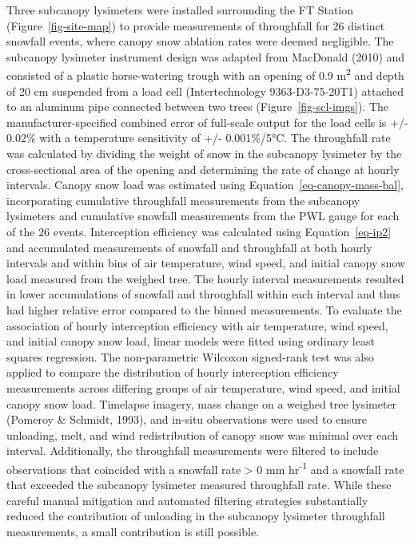 \documentclass[
  letterpaper,
  DIV=11,
  numbers=noendperiod]{scrartcl}
\begin{document}
Three subcanopy lysimeters were installed surrounding the FT Station
(Figure~\ref{fig-site-map}) to provide measurements of throughfall for
26 distinct snowfall events, where canopy snow ablation rates were
deemed negligible. The subcanopy lysimeter instrument design was adapted
from MacDonald (2010) and consisted of a plastic horse-watering trough
with an opening of 0.9 m\textsuperscript{2} and depth of 20 cm suspended
from a load cell (Intertechnology 9363-D3-75-20T1) attached to an
aluminum pipe connected between two trees (Figure~\ref{fig-scl-imgs}).
The manufacturer-specified combined error of full-scale output for the
load cells is +/- 0.02\% with a temperature sensitivity of +/-
0.001\%/5°C. The throughfall rate was calculated by dividing the weight
of snow in the subcanopy lysimeter by the cross-sectional area of the
opening and determining the rate of change at hourly intervals. Canopy
snow load was estimated using Equation~\ref{eq-canopy-mass-bal},
incorporating cumulative throughfall measurements from the subcanopy
lysimeters and cumulative snowfall measurements from the PWL gauge for
each of the 26 events. Interception efficiency was calculated using
Equation~\ref{eq-ip2} and accumulated measurements of snowfall and
throughfall at both hourly intervals and within bins of air temperature,
wind speed, and initial canopy snow load measured from the weighed tree.
The hourly interval measurements resulted in lower accumulations of
snowfall and throughfall within each interval and thus had higher
relative error compared to the binned measurements. To evaluate the
association of hourly interception efficiency with air temperature, wind
speed, and initial canopy snow load, linear models were fitted using
ordinary least squares regression. The non-parametric Wilcoxon
signed-rank test was also applied to compare the distribution of hourly
interception efficiency measurements across differing groups of air
temperature, wind speed, and initial canopy snow load. Timelapse
imagery, mass change on a weighed tree lysimeter (Pomeroy \& Schmidt,
1993), and in-situ observations were used to ensure unloading, melt, and
wind redistribution of canopy snow was minimal over each interval.
Additionally, the throughfall measurements were filtered to include
observations that coincided with a snowfall rate \textgreater{} 0 mm
hr\textsuperscript{-1} and a snowfall rate that exceeded the subcanopy
lysimeter measured throughfall rate. While these careful manual
mitigation and automated filtering strategies substantially reduced the
contribution of unloading in the subcanopy lysimeter throughfall
measurements, a small contribution is still possible.
\end{document}
